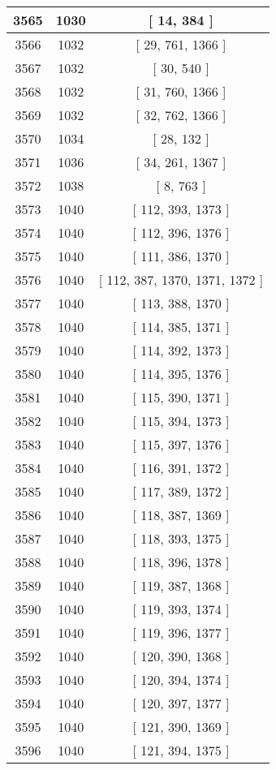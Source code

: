 \begin{center}
\begin{longtable}[H]{|| c c c ||}
\hline
3565 & 1030 & [ 14, 384 ] \\ 
\hline
3566 & 1032 & [ 29, 761, 1366 ] \\ 
\hline
3567 & 1032 & [ 30, 540 ] \\ 
\hline
3568 & 1032 & [ 31, 760, 1366 ] \\ 
\hline
3569 & 1032 & [ 32, 762, 1366 ] \\ 
\hline
3570 & 1034 & [ 28, 132 ] \\ 
\hline
3571 & 1036 & [ 34, 261, 1367 ] \\ 
\hline
3572 & 1038 & [ 8, 763 ] \\ 
\hline
3573 & 1040 & [ 112, 393, 1373 ] \\ 
\hline
3574 & 1040 & [ 112, 396, 1376 ] \\ 
\hline
3575 & 1040 & [ 111, 386, 1370 ] \\ 
\hline
3576 & 1040 & [ 112, 387, 1370, 1371, 1372 ] \\ 
\hline
3577 & 1040 & [ 113, 388, 1370 ] \\ 
\hline
3578 & 1040 & [ 114, 385, 1371 ] \\ 
\hline
3579 & 1040 & [ 114, 392, 1373 ] \\ 
\hline
3580 & 1040 & [ 114, 395, 1376 ] \\ 
\hline
3581 & 1040 & [ 115, 390, 1371 ] \\ 
\hline
3582 & 1040 & [ 115, 394, 1373 ] \\ 
\hline
3583 & 1040 & [ 115, 397, 1376 ] \\ 
\hline
3584 & 1040 & [ 116, 391, 1372 ] \\ 
\hline
3585 & 1040 & [ 117, 389, 1372 ] \\ 
\hline
3586 & 1040 & [ 118, 387, 1369 ] \\ 
\hline
3587 & 1040 & [ 118, 393, 1375 ] \\ 
\hline
3588 & 1040 & [ 118, 396, 1378 ] \\ 
\hline
3589 & 1040 & [ 119, 387, 1368 ] \\ 
\hline
3590 & 1040 & [ 119, 393, 1374 ] \\ 
\hline
3591 & 1040 & [ 119, 396, 1377 ] \\ 
\hline
3592 & 1040 & [ 120, 390, 1368 ] \\ 
\hline
3593 & 1040 & [ 120, 394, 1374 ] \\ 
\hline
3594 & 1040 & [ 120, 397, 1377 ] \\ 
\hline
3595 & 1040 & [ 121, 390, 1369 ] \\ 
\hline
3596 & 1040 & [ 121, 394, 1375 ] \\ 

\end{longtable}
\end{center}
